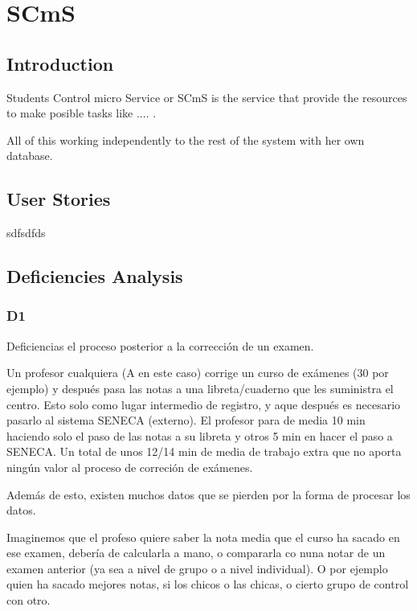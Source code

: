 \documentclass[oneside,english,titlepage]{scrbook}
\begin{document}
\section{SCmS}

\subsection{Introduction}

Students Control micro Service or SCmS is the service that provide
the resources to make posible tasks like .... .

All of this working independently to the rest of the system with her
own database.

\subsection{User Stories}

sdfsdfds

\subsection{Deficiencies Analysis}

\subsubsection{D1}

Deficiencias el proceso posterior a la corrección de un examen.

Un profesor cualquiera (A en este caso) corrige un curso de exámenes (30 por ejemplo) y después pasa las notas a una libreta/cuaderno que les suministra el centro. Esto solo como lugar intermedio de registro, y aque después es necesario pasarlo al sistema SENECA (externo).
El profesor para de media 10 min haciendo solo el paso de las notas a su libreta y otros 5 min en hacer el paso a SENECA. Un total de unos 12/14 min de media de trabajo extra que no aporta ningún valor al proceso de correción de exámenes.

Además de esto, existen muchos datos que se pierden por la forma de procesar los datos.

Imaginemos que el profeso quiere saber la nota media que el curso ha sacado en ese examen, debería de calcularla a mano, o compararla co nuna notar de un examen anterior (ya sea a nivel de grupo o a nivel individual). O por ejemplo quien ha sacado mejores notas, si los chicos o las chicas, o cierto grupo de control con otro.
\end{document}
